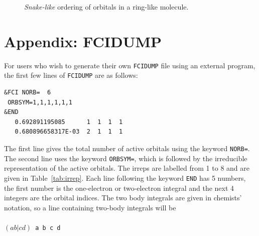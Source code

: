 \documentclass[letterpaper,12pt,aps, pra]{revtex4-1}
\begin{document}
\begin{figure}
 \begin{center}
 \end{center}
 \caption{\emph{Snake-like} ordering of orbitals in a ring-like molecule.}
 \label{fig:order}
 \end{figure}

 \section{Appendix: FCIDUMP}\label{sec:appFCIDUMP}
For users who wish to generate their own \texttt{FCIDUMP} file using an external program, the first few lines of \texttt{FCIDUMP} are as follows:
\begin{verbatim}
&FCI NORB=  6
 ORBSYM=1,1,1,1,1,1
&END
   0.692891195085      1  1  1  1
   0.680896658317E-03  2  1  1  1
\end{verbatim}
The first line gives the total number of active orbitals using the keyword \texttt{NORB=}. The second line uses the keyword \texttt{ORBSYM=}, which is followed by the irreducible representation of the active orbitals. The irreps are labelled from 1 to 8 and are given in Table~\ref{tab:irrep}.
Each line following the keyword \texttt{END} has 5 numbers, the first number is the one-electron or two-electron integral and the next 4 integers are the orbital indices. The two body integrals are given in chemists' notation, so a line containing two-body integrals will be\\
\texttt{
\\$( a b|cd)$ a b c d\\}
 
\end{document}
